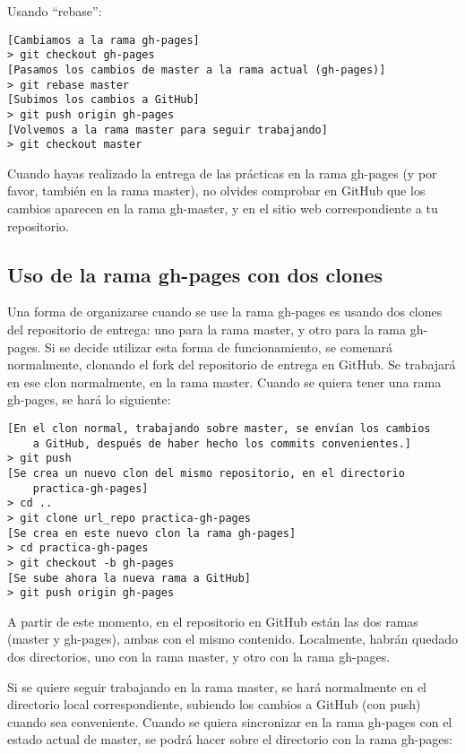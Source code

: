 Usando ``rebase'':

\begin{verbatim}
[Cambiamos a la rama gh-pages]
> git checkout gh-pages
[Pasamos los cambios de master a la rama actual (gh-pages)]
> git rebase master
[Subimos los cambios a GitHub]
> git push origin gh-pages
[Volvemos a la rama master para seguir trabajando]
> git checkout master
\end{verbatim}

Cuando hayas realizado la entrega de las prácticas en la rama gh-pages (y por favor, también en la rama master), no olvides comprobar en GitHub que los cambios aparecen en la rama gh-master, y en el sitio web correspondiente a tu repositorio.

\subsection{Uso de la rama gh-pages con dos clones}

Una forma de organizarse cuando se use la rama gh-pages es usando dos clones del repositorio de entrega: uno para la rama master, y otro para la rama gh-pages. Si se decide utilizar esta forma de funcionamiento, se comenará normalmente, clonando el fork del repositorio de entrega en GitHub. Se trabajará en ese clon normalmente, en la rama master. Cuando se quiera tener una rama gh-pages, se hará lo siguiente:

\begin{verbatim}
[En el clon normal, trabajando sobre master, se envían los cambios
    a GitHub, después de haber hecho los commits convenientes.]
> git push
[Se crea un nuevo clon del mismo repositorio, en el directorio
    practica-gh-pages]
> cd ..
> git clone url_repo practica-gh-pages
[Se crea en este nuevo clon la rama gh-pages]
> cd practica-gh-pages
> git checkout -b gh-pages
[Se sube ahora la nueva rama a GitHub]
> git push origin gh-pages
\end{verbatim}

A partir de este momento, en el repositorio en GitHub están las dos ramas (master y gh-pages), ambas con el mismo contenido. Localmente, habrán quedado dos directorios, uno con la rama master, y otro con la rama gh-pages.

Si se quiere seguir trabajando en la rama master, se hará normalmente en el directorio local correspondiente, subiendo los cambios a GitHub (con push) cuando sea conveniente. Cuando se quiera sincronizar en la rama gh-pages con el estado actual de master, se podrá hacer sobre el directorio con la rama gh-pages:

